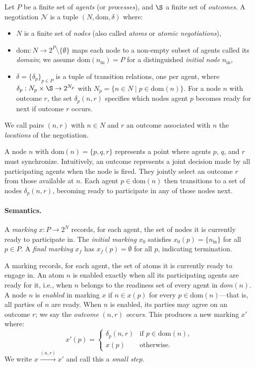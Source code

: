 \begin{definition}[Negotiation]
\label{def:negotiation}
Let $P$ be a finite set of \emph{agents} (or \emph{processes}), and $\S$ a finite set of \emph{outcomes}. A \textsf{negotiation} $\mathcal{N}$ is a tuple $(N, \text{dom}, \delta)$ where:
\begin{itemize}
\item $N$ is a finite set of \emph{nodes} (also called \emph{atoms} or \emph{atomic negotiations}),
\item $\text{dom} : N \rightarrow 2^P \setminus \{\emptyset\}$ maps each node to a non-empty subset of agents called its \emph{domain}; we assume $\text{dom}(n_{\text{in}}) = P$ for a distinguished \emph{initial node} $n_{\text{in}}$,
\item $\delta = \{\delta_p\}_{p \in P}$ is a tuple of transition relations, one per agent, where $\delta_p : N_p \times \S \rightarrow 2^{N_p}$ with $N_p = \{n \in N \mid p \in \text{dom}(n)\}$. For a node $n$ with outcome $r$, the set $\delta_p(n,r)$ specifies which nodes agent $p$ becomes ready for next if outcome $r$ occurs.
\end{itemize}
We call pairs $(n,r)$ with $n \in N$ and $r$ an outcome associated with $n$ the \emph{locations} of the negotiation.
\end{definition}

A node $n$ with $\text{dom}(n) = \{p,q,r\}$ represents a point where agents $p$, $q$, and $r$ must synchronize. Intuitively, an outcome represents a joint decision made by all participating agents when the node is fired. They jointly select an outcome $r$ from those available at $n$. Each agent $p \in \text{dom}(n)$ then transitions to a set of nodes $\delta_p(n,r)$, becoming ready to participate in any of those nodes next.

\paragraph{Semantics.}
A \emph{marking} $x : P \rightarrow 2^N$ records, for each agent, the set of nodes it is currently ready to participate in. The \emph{initial marking} $x_0$ satisfies $x_0(p) = \{n_{\text{in}}\}$ for all $p \in P$. A \emph{final marking} $x_f$ has $x_f(p) = \emptyset$ for all $p$, indicating termination.

A marking records, for each agent, the set of atoms it is currently ready to engage in. An atom $n$ is enabled exactly when all its participating agents are ready for it, i.e., when $n$ belongs to the readiness set of every agent in $dom(n)$. A node $n$ is \emph{enabled} in marking $x$ if $n \in x(p)$ for every $p \in \text{dom}(n)$—that is, all parties of $n$ are ready. When $n$ is enabled, its parties may agree on an outcome $r$; we say the \emph{outcome} $(n,r)$ \emph{occurs}. This produces a new marking $x'$ where:
\[
x'(p) = \begin{cases}
\delta_p(n,r) & \text{if } p \in \text{dom}(n), \\
x(p) & \text{otherwise}.
\end{cases}
\]
We write $x \xrightarrow{(n,r)} x'$ and call this a \emph{small step}.

